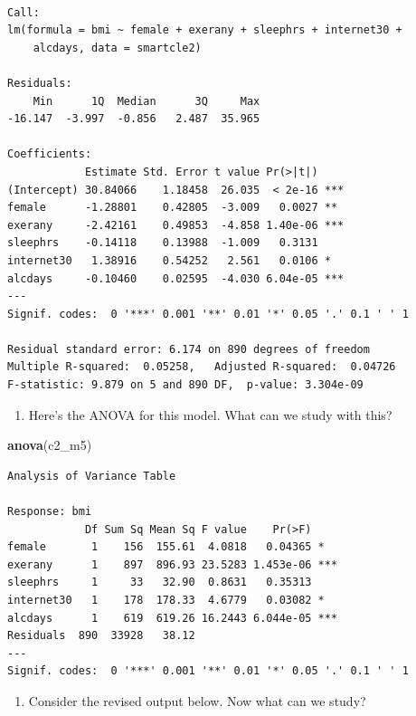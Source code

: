 \documentclass[]{book}
\newenvironment{Shaded}{\begin{snugshade}}{\end{snugshade}}
\newcommand{\KeywordTok}[1]{\textcolor[rgb]{0.13,0.29,0.53}{\textbf{#1}}}
\newcommand{\NormalTok}[1]{#1}
\providecommand{\tightlist}{%
  \setlength{\itemsep}{0pt}\setlength{\parskip}{0pt}}
\theoremstyle{definition}
\theoremstyle{definition}
\theoremstyle{definition}
\theoremstyle{remark}
\begin{document}
\begin{verbatim}

Call:
lm(formula = bmi ~ female + exerany + sleephrs + internet30 + 
    alcdays, data = smartcle2)

Residuals:
    Min      1Q  Median      3Q     Max 
-16.147  -3.997  -0.856   2.487  35.965 

Coefficients:
            Estimate Std. Error t value Pr(>|t|)    
(Intercept) 30.84066    1.18458  26.035  < 2e-16 ***
female      -1.28801    0.42805  -3.009   0.0027 ** 
exerany     -2.42161    0.49853  -4.858 1.40e-06 ***
sleephrs    -0.14118    0.13988  -1.009   0.3131    
internet30   1.38916    0.54252   2.561   0.0106 *  
alcdays     -0.10460    0.02595  -4.030 6.04e-05 ***
---
Signif. codes:  0 '***' 0.001 '**' 0.01 '*' 0.05 '.' 0.1 ' ' 1

Residual standard error: 6.174 on 890 degrees of freedom
Multiple R-squared:  0.05258,   Adjusted R-squared:  0.04726 
F-statistic: 9.879 on 5 and 890 DF,  p-value: 3.304e-09
\end{verbatim}

\begin{enumerate}
\def\labelenumi{\arabic{enumi}.}
\tightlist
\item
  Here's the ANOVA for this model. What can we study with this?
\end{enumerate}

\begin{Shaded}
\begin{Highlighting}[]
\KeywordTok{anova}\NormalTok{(c2_m5)}
\end{Highlighting}
\end{Shaded}

\begin{verbatim}
Analysis of Variance Table

Response: bmi
            Df Sum Sq Mean Sq F value    Pr(>F)    
female       1    156  155.61  4.0818   0.04365 *  
exerany      1    897  896.93 23.5283 1.453e-06 ***
sleephrs     1     33   32.90  0.8631   0.35313    
internet30   1    178  178.33  4.6779   0.03082 *  
alcdays      1    619  619.26 16.2443 6.044e-05 ***
Residuals  890  33928   38.12                      
---
Signif. codes:  0 '***' 0.001 '**' 0.01 '*' 0.05 '.' 0.1 ' ' 1
\end{verbatim}

\begin{enumerate}
\def\labelenumi{\arabic{enumi}.}
\setcounter{enumi}{1}
\tightlist
\item
  Consider the revised output below. Now what can we study?
\end{enumerate}
\end{document}
